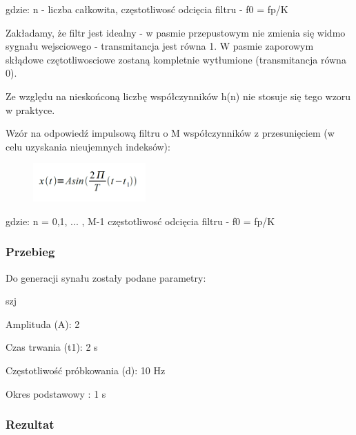 \documentclass[12pt]{article}
\begin{document}
gdzie:
\subitem n - liczba całkowita,
\subitem częstotliwosć odcięcia filtru - f0 =  fp/K

Zakładamy, że filtr jest idealny -  w pasmie przepustowym nie zmienia się widmo sygnału wejsciowego -  transmitancja jest równa  1. W pasmie zaporowym skłądowe czętotliwosciowe zostaną kompletnie wytłumione (transmitancja równa 0).

Ze względu na nieskońconą liczbę współczynników h(n) nie stosuje się tego wzoru w praktyce.

Wzór na odpowiedź impulsową filtru o M współczynników z przesunięciem (w celu uzyskania nieujemnych indeksów):

\begin{figure}[h!]
 \centering
 \includegraphics[width=4.3cm]{SinWzor.PNG}
 \vspace{-0.3cm}
 \label{gw}
\end{figure}

gdzie:
\subitem n = 0,1, ... , M-1
\subitem częstotliwosć odcięcia filtru - f0 =  fp/K

\subsubsection{Przebieg}
Do generacji synału zostały podane parametry:

\begin{labeling}{szj}
\item [Amplituda (A):] 2
\item [Czas trwania (t1):] 2 s
\item [Częstotliwość próbkowania (d): ] 10 Hz
\item [Okres podstawowy :] 1 s
\end{labeling}
\subsubsection{Rezultat}
\end{document}
